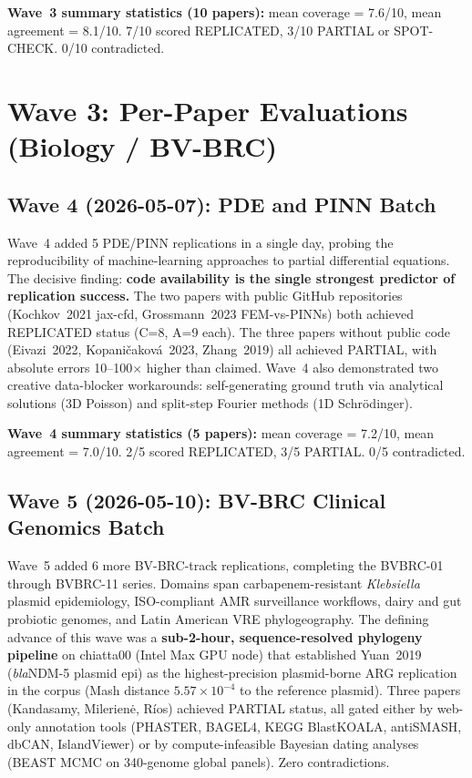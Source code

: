 \noindent\textbf{Wave~3 summary statistics (10 papers):}
mean coverage = 7.6/10, mean agreement = 8.1/10.
7/10 scored REPLICATED, 3/10 PARTIAL or SPOT-CHECK.
0/10 contradicted.

\iffull
\clearpage
\section*{Wave 3: Per-Paper Evaluations (Biology / BV-BRC)}










\fi

\subsection{Wave 4 (2026-05-07): PDE and PINN Batch}
Wave~4 added 5 PDE/PINN replications in a single day, probing the
reproducibility of machine-learning approaches to partial differential
equations. The decisive finding: \textbf{code availability is the single
strongest predictor of replication success.} The two papers with public
GitHub repositories (Kochkov~2021 jax-cfd, Grossmann~2023 FEM-vs-PINNs)
both achieved REPLICATED status (C=8, A=9 each). The three papers without
public code (Eivazi~2022, Kopani\v{c}akov\'a~2023, Zhang~2019) all
achieved PARTIAL, with absolute errors 10--100$\times$ higher than claimed.
Wave~4 also demonstrated two creative data-blocker workarounds:
self-generating ground truth via analytical solutions (3D Poisson) and
split-step Fourier methods (1D Schr\"odinger).

\noindent\textbf{Wave~4 summary statistics (5 papers):}
mean coverage = 7.2/10, mean agreement = 7.0/10.
2/5 scored REPLICATED, 3/5 PARTIAL.
0/5 contradicted.

\subsection{Wave 5 (2026-05-10): BV-BRC Clinical Genomics Batch}
Wave~5 added 6 more BV-BRC-track replications, completing the BVBRC-01
through BVBRC-11 series. Domains span carbapenem-resistant
\textit{Klebsiella} plasmid epidemiology, ISO-compliant AMR surveillance
workflows, dairy and gut probiotic genomes, and Latin American VRE
phylogeography. The defining advance of this wave was a
\textbf{sub-2-hour, sequence-resolved phylogeny pipeline} on chiatta00
(Intel Max GPU node) that established Yuan~2019 (\textit{bla}NDM-5
plasmid epi) as the highest-precision plasmid-borne ARG replication in
the corpus (Mash distance $5.57\times10^{-4}$ to the reference plasmid).
Three papers (Kandasamy, Milerien\.{e}, R\'{i}os) achieved PARTIAL
status, all gated either by web-only annotation tools (PHASTER, BAGEL4,
KEGG BlastKOALA, antiSMASH, dbCAN, IslandViewer) or by
compute-infeasible Bayesian dating analyses (BEAST MCMC on 340-genome
global panels). Zero contradictions.


